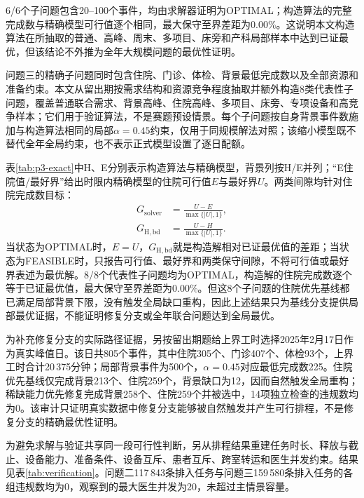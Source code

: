 6/6个子问题包含20--100个事件，均由求解器证明为OPTIMAL；构造算法的完整完成数与精确模型可行值逐个相同，最大保守至界差距为0.00\%。这说明本文构造算法在所抽取的普通、高峰、周末、多项目、床旁和产科局部样本中达到已证最优，但该结论不外推为全年大规模问题的最优性证明。

问题三的精确子问题同时包含住院、门诊、体检、背景最低完成数以及全部资源和准备约束。本文从留出期按需求结构和资源竞争程度抽取并额外构造8类代表性子问题，覆盖普通联合需求、背景高峰、住院高峰、多项目、床旁、专项设备和高竞争样本；它们用于验证算法，不是赛题预设情景。每个子问题按自身背景事件数施加与构造算法相同的局部$\alpha=0.45$约束，仅用于同规模解法对照；该缩小模型既不替代全年全局约束，也不表示正式模型设置了逐日配额。

\begin{table}[H]
\centering
\caption{问题三联合构造算法与CP-SAT精确子问题对照}
\label{tab:p3-exact}

\end{table}

表\ref{tab:p3-exact}中H、E分别表示构造算法与精确模型，背景列按H/E并列；“E住院值/最好界”给出时限内精确模型的住院可行值$E$与最好界$U$。两类间隙均针对住院完成数目标：
\begin{align}
G_{\mathrm{solver}}&=\frac{U-E}{\max\{|U|,1\}},\\
G_{\mathrm{H,bd}}&=\frac{U-H}{\max\{|U|,1\}}.
\end{align}
当状态为OPTIMAL时，$E=U$，$G_{\mathrm{H,bd}}$就是构造解相对已证最优值的差距；当状态为FEASIBLE时，只报告可行值、最好界和两类保守间隙，不将可行值或最好界表述为最优解。8/8个代表性子问题均为OPTIMAL，构造解的住院完成数逐个等于已证最优值，最大保守至界差距为0.00\%。但这8个子问题的住院优先基线都已满足局部背景下限，没有触发全局缺口重构，因此上述结果只为基线分支提供局部最优证据，不能证明修复分支或全年联合问题达到全局最优。

为补充修复分支的实际路径证据，另按留出期题给上界工时选择2025年2月17日作为真实峰值日。该日共805个事件，其中住院305个、门诊407个、体检93个，上界工时合计20\,375分钟；局部背景事件为500个，$\alpha=0.45$对应最低完成数225。住院优先基线仅完成背景213个、住院259个，背景缺口为12，因而自然触发全局重构；稀缺能力优先修复完成背景258个、住院259个并被选中，14项独立检查的违规数均为0。该审计只证明真实数据中修复分支能够被自然触发并产生可行排程，不是修复分支的精确最优性证明。

为避免求解与验证共享同一段可行性判断，另从排程结果重建任务时长、释放与截止、设备能力、准备条件、设备互斥、患者互斥、跨室转运和医生并发约束。结果见表\ref{tab:verification}。问题二117\,843条排入任务与问题三159\,580条排入任务的各组违规数均为0，观察到的最大医生并发为20，未超过主情景容量。

